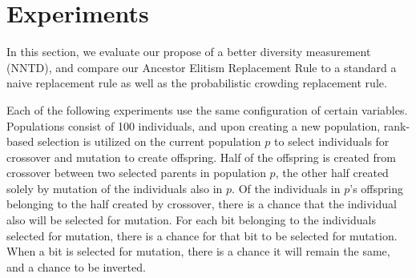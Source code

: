 \section{Experiments}
In this section, we evaluate our propose of a better diversity measurement (NNTD), and compare our Ancestor Elitism Replacement Rule to a standard a naive replacement rule as well as the probabilistic crowding replacement rule.

Each of the following experiments use the same configuration of certain variables. Populations consist of \num{100} individuals, and upon creating a new population, rank-based selection is utilized on the current population $p$ to select individuals for crossover and mutation to create offspring. Half of the offspring is created from crossover between two selected parents in population $p$, the other half created solely by mutation of the individuals also in $p$. Of the individuals in $p$'s offspring belonging to the half created by crossover, there is a  chance that the individual also will be selected for mutation. For each bit belonging to the individuals selected for mutation, there is a  chance for that bit to be selected for mutation. When a bit is selected for mutation, there is a  chance it will remain the same, and a  chance to be inverted.



